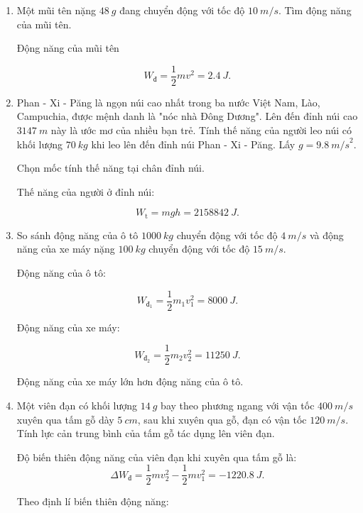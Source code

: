 \begin{enumerate}[label=\bfseries Câu \arabic*:]
{		- Khi va vào Trái Đất, năng lượng của thiên thạch được chuyển hóa thành động năng, tạo thành các hố lõm trên bề mặt Trái Đất.
	}
	\item {}
	
	
	{
		Một mũi tên nặng $\SI{48}{g}$ đang chuyển động với tốc độ $\SI{10}{m/s}$. Tìm động năng của mũi tên.
	}
	
	\hideall
	{	
		Động năng của mũi tên
		
		$$W_\text{đ} = \dfrac{1}{2}mv^2 =\SI{2,4}{J}.$$
	}
	\item {}
	
	
	{
		Phan - Xi - Păng là ngọn núi cao nhất trong ba nước Việt Nam, Lào, Campuchia, được mệnh danh là "nóc nhà Đông Dương". Lên đến đỉnh núi cao $\SI{3147}{m}$ này là ước mơ của nhiều bạn trẻ. Tính thế năng của người leo núi có khối lượng $\SI{70}{kg}$ khi leo lên đến đỉnh núi Phan - Xi - Păng. Lấy $g = \SI{9,8}{m/s}^2.$
	}
	
	\hideall
	{	
		Chọn mốc tính thế năng tại chân đỉnh núi.
		
		Thế năng của người ở đỉnh núi:
		
		$$W_\text{t} = mgh = \SI{2158842}{J}.$$
	}
	\item {}
	
	
	{
		So sánh động năng của ô tô $\SI{1000}{kg}$ chuyển động với tốc độ $\SI{4}{m/s}$ và động năng của xe máy nặng $\SI{100}{kg} $ chuyển động với tốc độ $\SI{15}{m/s}$.
	}
	
	\hideall
	{	
		Động năng của ô tô:
		
		$$W_{\text{đ}_1} = \dfrac{1}{2}m_1v_1^2 = \SI{8000}{J}.$$
		
		Động năng của xe máy:
		
		$$W_{\text{đ}_2} = \dfrac{1}{2}m_2v_2^2 = \SI{11250}{J}.$$
		
		Động năng của xe máy lớn hơn động năng của ô tô.
	}
	\item {}
	
	
	{
		Một viên đạn có khối lượng $\SI{14}{g}$ bay theo phương ngang với vận tốc $\SI{400}{m/s}$ xuyên qua tấm gỗ dày $\SI{5}{cm}$, sau khi xuyên qua gỗ, đạn có vận tốc $\SI{120}{m/s}$. Tính lực cản trung bình của tấm gỗ tác dụng lên viên đạn.
	}
	
	\hideall
	{	
		Độ biến thiên động năng của viên đạn khi xuyên qua tấm gỗ là:
		$$\Delta W_\text{đ} = \dfrac{1}{2}mv^2_2 - \dfrac{1}{2}mv_1^2 = - \SI{1220,8}{J}.$$
		
		Theo định lí biến thiên động năng:
		
}
\end{enumerate}
